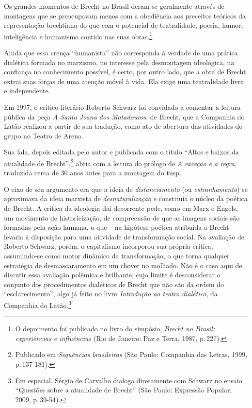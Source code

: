 {\startblockquote
Os grandes momentos de Brecht no Brasil deram-se geralmente através de
montagens que se preocupavam menos com a obediência aos preceitos
teóricos da representação brechtiana do que com o potencial de
teatralidade, poesia, humor, inteligência e humanismo contido nas suas
obras.\footnote{O depoimento foi publicado no livro do simpósio,
  {\it Brecht no Brasil: experiências e influências} (Rio de Janeiro:
  Paz e Terra, 1987, p.\,227).}
\stopblockquote

Ainda que essa crença “humanista” não corresponda à verdade de uma
prática dialética formada no marxismo, no interesse pela desmontagem
ideológica, na confiança no conhecimento possível, é certo, por outro
lado, que a obra de Brecht extrai suas forças de uma atenção móvel à
vida. Ela exige uma teatralidade livre e independente.

Em 1997, o crítico literário Roberto Schwarz foi convidado a comentar a
leitura pública da peça {\it A Santa Joana dos Matadouros}, de Brecht,
que a Companhia do Latão realizou a partir de sua tradução, como ato de
abertura das atividades do grupo no Teatro de Arena.

Sua fala, depois editada pelo autor e publicada com o título
“Altos e baixos da atualidade de Brecht”,\footnote{Publicado em
  {\it Sequências brasileiras} (São Paulo: Companhia das Letras, 1999,
  p.\,137-181).} abria com a leitura do prólogo de {\it A exceção e a
regra}, traduzida cerca de 30 anos antes para a montagem do {\sc tusp}.

O eixo de seu argumento era que a ideia de {\it distanciamento} (ou
{\it estranhamento}) se aproximava da ideia marxista de
{\it desnaturalização} e constituía o núcleo da poética de Brecht. A
crítica da ideologia daí decorrente pede, como em Marx e Engels, um
movimento de historicização, de compreensão de que as imagens sociais
são formadas pela ação humana, o que -- na hipótese poética atribuída a
Brecht -- levaria à disposição para uma atividade de transformação
social. Na avaliação de Roberto Schwarz, porém, o capitalismo incorporou
sua própria crítica, assumindo-se como motor dinâmico da transformação,
o que torna qualquer estratégia de desmascaramento em um chover no molhado.
Não é o caso aqui de discutir essa avaliação polêmica e brilhante, cujo
limite é desconsiderar o conjunto dos procedimentos dialéticos de Brecht
que não são da ordem do “esclarecimento”, algo já feito no livro
{\it Introdução ao teatro dialético}, da Companhia do Latão.\footnote{Em
  especial, Sérgio de Carvalho dialoga diretamente com Schwarz no ensaio
  “Questões sobre a atualidade de Brecht” (São Paulo: Expressão Popular,
  2009, p.\,39-54).}

}
